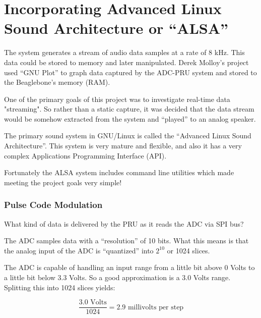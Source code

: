 \chapter{Incorporating Advanced Linux Sound Architecture or ``ALSA''}

The system generates a stream of audio data samples at a rate of 8 kHz.  This data could be stored to memory and later manipulated.  Derek Molloy's project used ``GNU Plot'' to graph data captured by the ADC-PRU system and stored to the Beaglebone's memory (RAM).

One of the primary goals of this project was to investigate real-time data "streaming".  So rather than a static capture, it was decided that the data stream would be somehow extracted from the system and ``played'' to an analog speaker.

The primary sound system in GNU/Linux is called the ``Advanced Linux Sound Architecture''.  This system is very mature and flexible, and also it has a very complex Applications Programming Interface (API).

Fortunately the ALSA system includes command line utilities which made meeting the project goals very simple!

\subsection{Pulse Code Modulation}

What kind of data is delivered by the PRU as it reads the ADC via SPI bus?

The ADC samples data with a ``resolution'' of 10 bits.  What this means is that the analog input of the ADC is ``quantized'' into $2^{10}$ or 1024 slices.

The ADC is capable of handling an input range from a little bit above 0 Volts to a little bit below 3.3 Volts.  So a good approximation is a 3.0 Volts range.  Splitting this into 1024 slices yields:

\[ \frac{\text{3.0 Volts}}{1024}  = \text{2.9 millivolts per step} \]